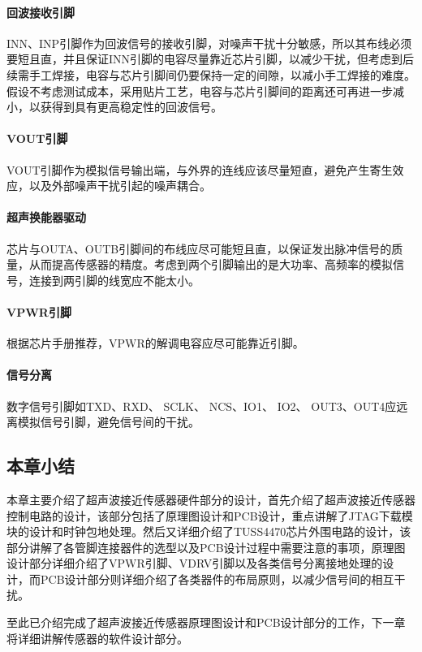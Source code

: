      \paragraph{回波接收引脚}
    INN、INP引脚作为回波信号的接收引脚，对噪声干扰十分敏感，所以其布线必须要短且直，并且保证INN引脚的电容尽量靠近芯片引脚，以减少干扰，但考虑到后续需手工焊接，电容与芯片引脚间仍要保持一定的间隙，以减小手工焊接的难度。假设不考虑测试成本，采用贴片工艺，电容与芯片引脚间的距离还可再进一步减小，以获得到具有更高稳定性的回波信号。
    \paragraph{VOUT引脚}
    VOUT引脚作为模拟信号输出端，与外界的连线应该尽量短直，避免产生寄生效应，以及外部噪声干扰引起的噪声耦合。\par
    \paragraph{超声换能器驱动}
    芯片与OUTA、OUTB引脚间的布线应尽可能短且直，以保证发出脉冲信号的质量，从而提高传感器的精度。考虑到两个引脚输出的是大功率、高频率的模拟信号，连接到两引脚的线宽应不能太小。\par
    \paragraph{VPWR引脚}
        根据芯片手册推荐，VPWR的解调电容应尽可能靠近引脚。\par
     \paragraph{信号分离}
     数字信号引脚如TXD、RXD、 SCLK、 NCS、IO1、 IO2、 OUT3、OUT4应远离模拟信号引脚，避免信号间的干扰。\par
\subsection{本章小结}
本章主要介绍了超声波接近传感器硬件部分的设计，首先介绍了超声波接近传感器控制电路的设计，该部分包括了原理图设计和PCB设计，重点讲解了JTAG下载模块的设计和时钟包地处理。然后又详细介绍了TUSS4470芯片外围电路的设计，该部分讲解了各管脚连接器件的选型以及PCB设计过程中需要注意的事项，原理图设计部分详细介绍了VPWR引脚、VDRV引脚以及各类信号分离接地处理的设计，而PCB设计部分则详细介绍了各类器件的布局原则，以减少信号间的相互干扰。\par
至此已介绍完成了超声波接近传感器原理图设计和PCB设计部分的工作，下一章将详细讲解传感器的软件设计部分。

      
    
    
    